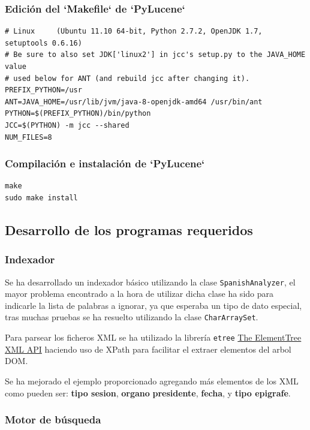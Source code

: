 \subsubsection{Edición del `Makefile` de `PyLucene`}
\begin{lstlisting}
# Linux     (Ubuntu 11.10 64-bit, Python 2.7.2, OpenJDK 1.7, setuptools 0.6.16)
# Be sure to also set JDK['linux2'] in jcc's setup.py to the JAVA_HOME value
# used below for ANT (and rebuild jcc after changing it).
PREFIX_PYTHON=/usr
ANT=JAVA_HOME=/usr/lib/jvm/java-8-openjdk-amd64 /usr/bin/ant
PYTHON=$(PREFIX_PYTHON)/bin/python
JCC=$(PYTHON) -m jcc --shared
NUM_FILES=8
\end{lstlisting}

\subsubsection{Compilación e instalación de `PyLucene`}
\begin{lstlisting}
make
sudo make install
\end{lstlisting}


\subsection{Desarrollo de los programas requeridos}

\subsubsection{Indexador}

Se ha desarrollado un indexador básico utilizando la clase
\texttt{SpanishAnalyzer}, el mayor problema encontrado a la hora de
utilizar dicha clase ha sido para indicarle la lista de palabras a
ignorar, ya que esperaba un tipo de dato especial, tras muchas pruebas se ha resuelto utilizando la clase \texttt{CharArraySet}. 

Para parsear los ficheros XML se ha utilizado la librería \texttt{etree} \href{https://docs.python.org/2/library/xml.etree.elementtree.html}{The ElementTree XML API} haciendo uso de XPath para facilitar el extraer elementos del arbol DOM.

Se ha mejorado el ejemplo proporcionado agregando más elementos de los XML como pueden ser: \textbf{tipo sesion}, \textbf{organo}
\textbf{presidente}, \textbf{fecha}, y \textbf{tipo epigrafe}.



\subsubsection{Motor de búsqueda}

